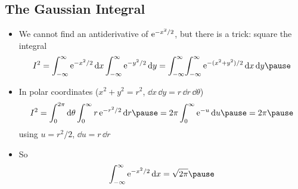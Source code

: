 \begin{slide}
\section[-2]{The Gaussian Integral}

\begin{PauseHighLight}\squeeze
  \begin{itemize}
  \item We cannot find an antiderivative of ${\rm e}^{-x^2/2}$, but there is a
    trick: square the integral
    \begin{align*}
      I^2 = \int_{-\infty}^{\infty} \e{-x^2/2}\,\dd x
      \int_{-\infty}^{\infty} \e{-y^2/2}\,\dd y
      = \int_{-\infty}^{\infty}\!\int_{-\infty}^{\infty}
      \e{-(x^2+y^2)/2}\,\dd x\,\dd y\pause
    \end{align*}
  \item In polar coordinates ($x^2+y^2=r^2$, $\dd x\,\dd y =
    r\,\dd r\,\dd\theta$)
    \begin{align*}
      I^2 = \int_0^{2\pi}\dd\theta \int_0^\infty r\,\e{-r^2/2}\,\dd r
      \pause = 2\pi\int_0^\infty \e{-u}\,\dd u \pause = 2\pi\pause
    \end{align*}
    using $u = r^2/2$, $\dd u = r\,\dd r$\pause
  \item So
    \begin{align*}
      \int_{-\infty}^{\infty} \e{-x^2/2}\,\dd x = \sqrt{2\pi}\pause
    \end{align*}
  \end{itemize}
\end{PauseHighLight}

\end{slide}


